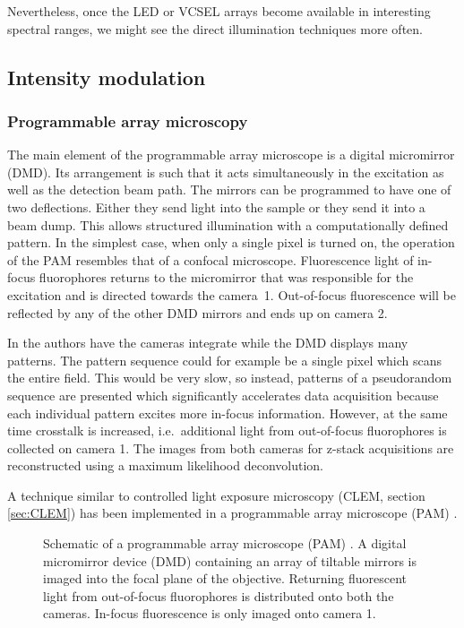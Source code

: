 Nevertheless, once the LED or VCSEL arrays become available in
interesting spectral ranges, we might see the direct illumination
techniques more often.

\subsection{Intensity modulation}
\subsubsection{Programmable array microscopy}
\label{ref:pam}
The main element of the programmable array microscope is a digital
micromirror (DMD). Its arrangement is such that it acts simultaneously
in the excitation as well as the detection beam path. The mirrors can
be programmed to have one of two deflections. Either they send light
into the sample or they send it into a beam dump. This allows
structured illumination with a computationally defined pattern. In the
simplest case, when only a single pixel is turned on, the operation of
the PAM resembles that of a confocal microscope. Fluorescence light of
in-focus fluorophores returns to the micromirror that was responsible
for the excitation and is directed towards the camera~1. Out-of-focus
fluorescence will be reflected by any of the other DMD mirrors and
ends up on camera 2. 

In \cite{Heintzmann2001a} the authors have the cameras integrate while
the DMD displays many patterns. The pattern sequence could for example
be a single pixel which scans the entire field. This would be very
slow, so instead, patterns of a pseudorandom sequence are presented
which significantly accelerates data acquisition because each
individual pattern excites more in-focus information. However, at the
same time crosstalk is increased, i.e.\ additional light from
out-of-focus fluorophores is collected on camera 1.  The images from
both cameras for z-stack acquisitions are reconstructed using a
maximum likelihood deconvolution.

A technique similar to controlled light exposure microscopy (CLEM,
section \ref{sec:CLEM}) has been implemented in a programmable array
microscope (PAM) \citep{Caarls2011}. 

\begin{figure}[!hbt]
  \centering
  \caption{Schematic of a programmable array microscope (PAM)
    \citep[inspired from][]{Verveer1998}. A digital micromirror
    device (DMD) containing an array of tiltable mirrors is imaged
    into the focal plane of the objective. Returning fluorescent light
    from out-of-focus fluorophores is distributed onto both the
    cameras. In-focus fluorescence is only imaged onto camera 1.}
  \label{fig:pam-sketch}
\end{figure}

